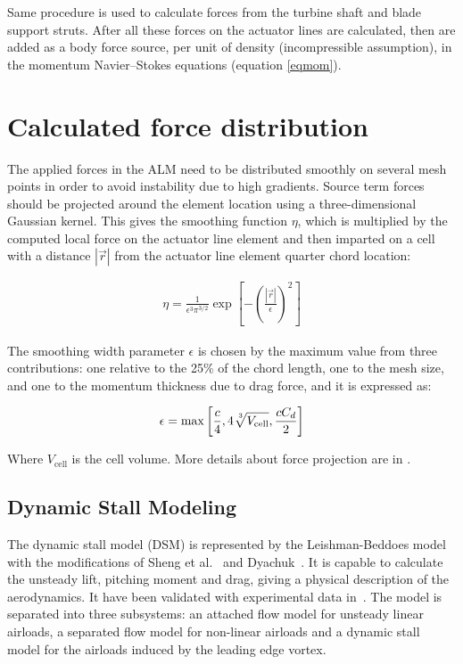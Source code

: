 \documentclass[a4paper]{jpconf}
\begin{document}
Same procedure is used to calculate forces from the turbine shaft and blade
support struts. After all these forces on the actuator lines are calculated,
then are added as a body force source, per unit of density (incompressible
assumption), in the momentum Navier--Stokes equations (equation \ref{eqmom}).

\section*{Calculated force distribution}
The applied forces in the ALM need to be distributed smoothly on several mesh points in order to avoid instability due to high gradients. Source term forces should be projected around the element location using a three-dimensional Gaussian kernel. This gives the smoothing function $\eta$, which is multiplied by the computed local force on the actuator line element and then imparted on a cell with a distance $| \vec r |$ from the actuator line element quarter chord location:

\begin{align*}
\eta = \frac{1}{\epsilon ^3 \pi ^{3/2} } \exp \left[ - \left( \frac{| \vec r |}{\epsilon} \right) ^2 \right]
\end{align*}

The smoothing width parameter $\epsilon$ is chosen by the maximum value from three contributions: one relative to the 25\% of the chord length, one to the mesh size, and one to the momentum thickness due to drag force, and it is expressed as:

\begin{align*}
\epsilon = \max \left[ \frac{c}{4},4 \sqrt[\leftroot{-2}\uproot{2}3]{V_{\mathrm{cell}}},  \frac{c C_d}{2}\right]
\end{align*}

Where ${V_{\mathrm{cell}}}$ is the cell volume. More details about force projection are in \cite{Bachant2016-VAT-ALM}.


\subsection{Dynamic Stall Modeling}

The dynamic stall model (DSM) is represented by the Leishman-Beddoes
model~\cite{leishman1986generalised} with the modifications of Sheng et
al.~\cite{sheng2008modified} and Dyachuk~\cite{dyachuk}. It is capable to
calculate the unsteady lift, pitching moment and drag, giving a physical
description of the aerodynamics. It have been validated with experimental data
in~\cite{leishman1989semi}. The model is separated into three subsystems: an
attached flow model for unsteady linear airloads, a separated flow model for
non-linear airloads and a dynamic stall model for the airloads induced by the
leading edge vortex.
\end{document}
